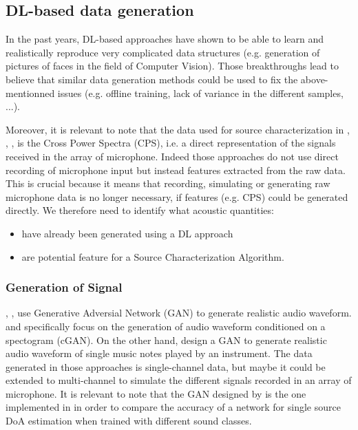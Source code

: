 \documentclass{article}
\begin{document}
\subsection{DL-based data generation}

In the past years, DL-based approaches have shown to be able to learn and realistically reproduce very complicated data structures (e.g. generation of pictures of faces in the field of Computer Vision). Those breakthroughs lead to believe that similar data generation methods could be used to fix the above-mentionned issues (e.g. offline training, lack of variance in the different samples, ...).

Moreover, it is relevant to note that the data used for source characterization in \cite{castellini2021neural}, \cite{lee2021deep}, \cite{ma2019phased}, \cite{xu2021deep} is the Cross Power Spectra (CPS), i.e. a direct representation of the signals received in the array of microphone. Indeed those approaches do not use direct recording of microphone input but instead features extracted from the raw data. This is crucial because it means that recording, simulating or generating raw microphone data is no longer necessary, if features (e.g. CPS) could be generated directly. We therefore need to identify what acoustic quantities:
\begin{itemize}
    \item have already been generated using a DL approach
    \item are potential feature for a Source Characterization Algorithm.
\end{itemize}


\subsubsection{Generation of Signal}

\cite{neekhara2019expediting}, \cite{NEURIPS2019_6804c9bc}, \cite{engel2019gansynth} use Generative Adversial Network (GAN) to generate realistic audio waveform. \cite{neekhara2019expediting} and \cite{NEURIPS2019_6804c9bc} specifically focus on the generation of audio waveform conditioned on a spectogram (cGAN). On the other hand, \cite{engel2019gansynth} design a GAN to generate realistic audio waveform of single music notes played by an instrument. The data generated in those approaches is single-channel data, but maybe it could be extended to multi-channel to simulate the different signals recorded in an array of microphone. It is relevant to note that the GAN designed by \cite{neekhara2019expediting} is the one implemented in \cite{vargas2021improved} in order to compare the accuracy of a network for single source DoA estimation when trained with different sound classes.
\end{document}
